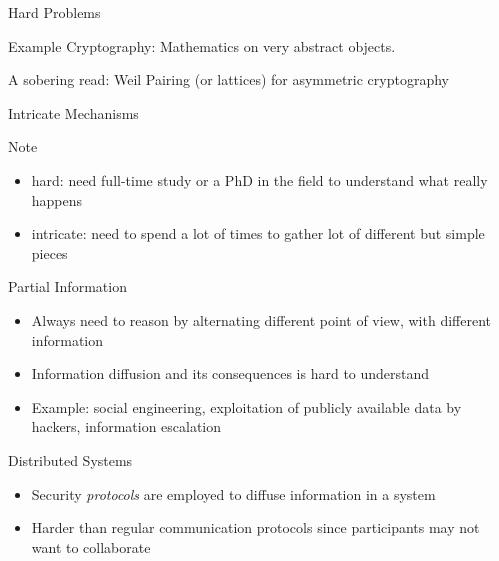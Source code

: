 \begin{reveals}
\begin{frame}{Hard Problems}
  \vfill

  \begin{block}{Example}
    Cryptography: Mathematics on very abstract objects. 
      \begin{center}
        A sobering read: Weil Pairing (or lattices) for asymmetric
        cryptography
      \end{center}
  \end{block}


\end{frame}

\begin{frame}[c]{Intricate Mechanisms}
  
  \begin{block}{Note}
    \begin{itemize}
    \item hard: need full-time study or a PhD in the field to
      understand what really happens
    \item intricate: need to spend a lot of times to gather lot of
      different but simple pieces
    \end{itemize}
  \end{block}

  \vfill

  \begin{block}{Partial Information}
    \begin{itemize}
    \item Always need to reason by alternating different point of
      view, with different information
    \item Information diffusion and its consequences is hard to understand
    \item Example: social engineering, exploitation of publicly
      available data by hackers, information escalation
    \end{itemize}
  \end{block}

  \vfill

  \begin{block}{Distributed Systems}
    \begin{itemize}
    \item Security \emph{protocols} are employed to diffuse information in a system
    \item Harder than regular communication protocols since
      participants may not want to collaborate
    \end{itemize}
  \end{block}


\end{frame}
\end{reveals}
